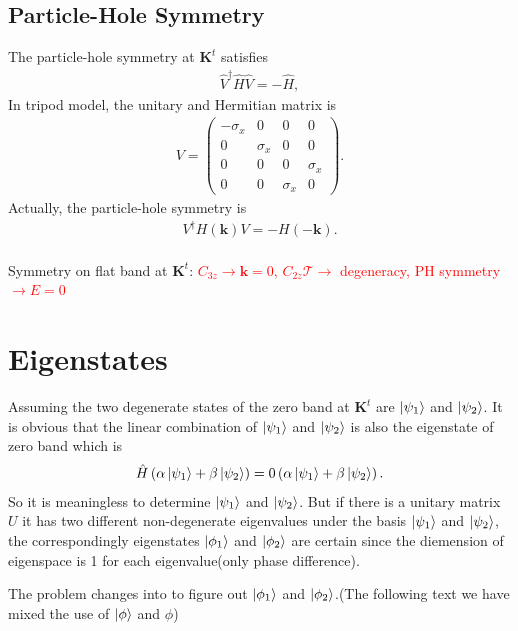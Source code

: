 \documentclass[10pt, oneside]{article}
\newcommand{\ph}{\phi}
\newcommand{\p}[1]{\left(#1\right)}
\begin{document}
\subsection{Particle-Hole Symmetry}
The particle-hole symmetry at \(\bm{K}^{t}\) satisfies
\begin{align}
	\hat{V}^{\dagger} \hat{H} \hat{V} = - \hat{H},
\end{align}
In tripod model, the unitary and Hermitian matrix is 
\begin{align}
	V = \begin{pmatrix}
		-\sigma_{x} & 0 & 0 & 0 \\
		0 & \sigma_{x} & 0 & 0 \\
		0 & 0 & 0 & \sigma_{x} \\
		0 & 0 & \sigma_{x} & 0
	\end{pmatrix}.
\end{align}
Actually, the particle-hole symmetry is 
\begin{align}
	V^\dagger H(\bm{k}) V = - H(-\bm{k}).
\end{align}
\\
Symmetry on flat band at $\mathbf{K}^{t}$: \textcolor{red}{\(C_{3z} \rightarrow \bm{k} = 0\),  \( C_{2z} \mathcal{T} \rightarrow\) degeneracy, PH symmetry \(\rightarrow E = 0\) }



\section{Eigenstates}
Assuming the two degenerate states of the zero band at \(\bm{K}^{t}\) are \(\ket{\psi_{1}}\) and \(\ket{\psi_{2}}\). It is obvious that the linear combination of \(\ket{\psi_{1}}\) and \(\ket{\psi_{2}}\) is also the eigenstate of zero band which is 
\begin{align}
	\hat{H} \p{\alpha \ket{\psi_{1}} + \beta \ket{\psi_{2}} } = 0 \p{\alpha \ket{\psi_{1}} + \beta \ket{\psi_{2}} }.
\end{align}
So it is meaningless to determine \(\ket{\psi_{1}}\) and \(\ket{\psi_{2}}\). But if there is a unitary matrix \(U\) it has two different non-degenerate eigenvalues under the basis \(\ket{\psi_{1}}\) and \(\ket{\psi_{2}}\), the correspondingly eigenstates \(\ket{\phi_{1}}\) and \(\ket{\phi_{2}}\) are certain since the diemension of eigenspace is 1 for each eigenvalue(only phase difference).  

The problem changes into to figure out \(\ket{\phi_{1}}\) and \(\ket{\phi_{2}}\).(The following text we have mixed the use of \(\ket{\ph}\) and \(\ph\)) 
\end{document}
